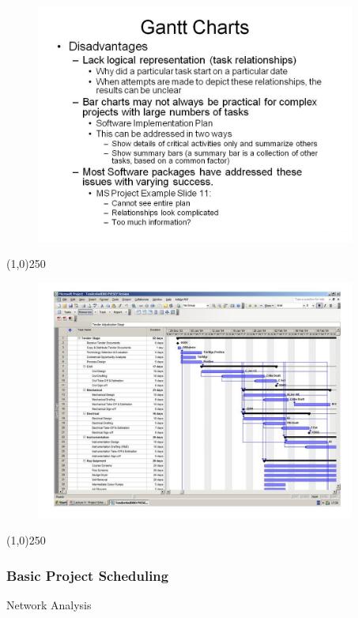 \begin{frame}
\begin{figure}
	\centering
		\includegraphics[width = 10.5cm]{oldnotes/Slide41.jpg}
\end{figure}
\end{frame}
\begin{center}\line(1,0){250}\end{center}





\begin{frame}
\begin{figure}
	\centering
		\includegraphics[width = 10.5cm]{oldnotes/Slide42.jpg}
\end{figure}
\end{frame}
\begin{center}\line(1,0){250}\end{center}




\begin{frame}
	\frametitle{Basic Project Scheduling}
	\begin{block}{Network Analysis}
		
	\end{block}
\end{frame}

